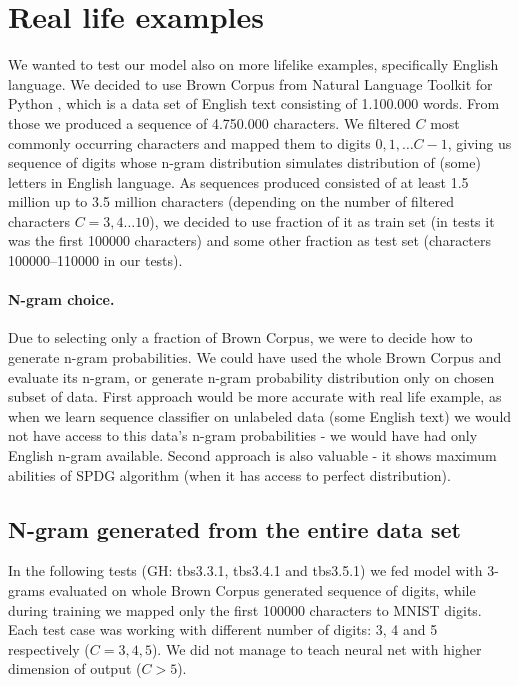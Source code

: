 \documentclass[declaration,shortabstract,lic,english]{iithesis}
\begin{document}
\section{Real life examples}
\label{section:real_life}

We wanted to test our model also on more lifelike examples, specifically English language. We decided to use Brown Corpus \citep{francis1964brown} from Natural Language Toolkit for Python \citep{loper2002nltk}, which is a data set of English text consisting of 1.100.000 words. From those we produced a sequence of 4.750.000 characters. We filtered $C$ most commonly occurring characters and mapped them to digits $0, 1, \dots C-1$, giving us sequence of digits whose n-gram distribution simulates distribution of (some) letters in English language. As sequences produced consisted of at least 1.5 million up to 3.5 million characters (depending on the number of filtered characters $C=3,4\dots10$), we decided to use fraction of it as train set (in tests it was the first 100000 characters) and some other fraction as test set (characters 100000--110000 in our tests). 

\paragraph{N-gram choice.} Due to selecting only a fraction of Brown Corpus, we were to decide how to generate n-gram probabilities. We could have used the whole Brown Corpus and evaluate its n-gram, or generate n-gram probability distribution only on chosen subset of data. First approach would be more accurate with real life example, as when we learn sequence classifier on unlabeled data (some English text) we would not have access to this data's n-gram probabilities - we would have had only English n-gram available. Second approach is also valuable - it shows maximum abilities of SPDG algorithm (when it has access to perfect distribution).

\subsection{N-gram generated from the entire data set}

In the following tests (GH: tbs3.3.1, tbs3.4.1 and tbs3.5.1) we fed model with 3-grams evaluated on whole Brown Corpus generated sequence of digits, while during training we mapped only the first 100000 characters to MNIST digits. Each test case was working with different number of digits: 3, 4 and 5 respectively ($C=3, 4, 5$). We did not manage to teach neural net with higher dimension of output ($C > 5$).
\end{document}
